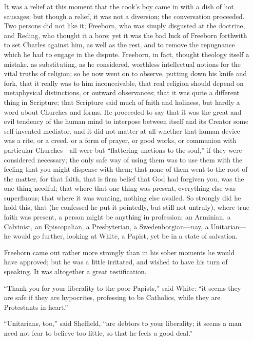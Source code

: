 It was a relief at this moment that the cook's boy came in with a
dish of hot sausages; but though a relief, it was not a diversion; the
conversation proceeded. Two persons did not like it; Freeborn, who was
simply disgusted at the doctrine, and Reding, who thought it a bore;
yet it was the bad luck of Freeborn forthwith to set Charles against
him, as well as the rest, and to remove the repugnance which he had to
engage in the dispute. Freeborn, in fact, thought theology itself a
mistake, as substituting, as he considered, worthless intellectual
notions for the vital truths of religion; so he now went on to
observe, putting down his knife and fork, that it really was to him
inconceivable, that real religion should depend on metaphysical
distinctions, or outward observances; that it was quite a different
thing in Scripture; that Scripture said much of faith and
holiness, but hardly a word about Churches and forms. He proceeded to
say that it was the great and evil tendency of the human mind to
interpose between itself and its Creator some self-invented mediator,
and it did not matter at all whether that human device was a rite, or
a creed, or a form of prayer, or good works, or communion with
particular Churches—all were but ``flattering unctions to the
soul,'' if they were considered necessary; the only safe way of
using them was to use them with the feeling that you might dispense
with them; that none of them went to the root of the matter, for that
faith, that is firm belief that God had forgiven you, was the one
thing needful; that where that one thing was present, everything else
was superfluous; that where it was wanting, nothing else availed. So
strongly did he hold this, that (he confessed he put it pointedly, but
still not untruly), where true faith was present, a person might be
anything in profession; an Arminian, a Calvinist, an Episcopalian, a
Presbyterian, a Swedenborgian—nay, a Unitarian—he would go
further, looking at White, a Papist, yet be in a state of salvation.

Freeborn came out rather more strongly than in his sober moments he
would have approved; but he was a little irritated, and wished to have
his turn of speaking. It was altogether a great testification.

``Thank you for your liberality to the poor Papists,'' said
White: ``it seems they are safe if they are hypocrites, professing
to be Catholics, while they are Protestants in heart.''

``Unitarians, too,'' said Sheffield, ``are debtors to
your liberality; it seems a man need not fear to believe too little,
so that he feels a good deal.''

